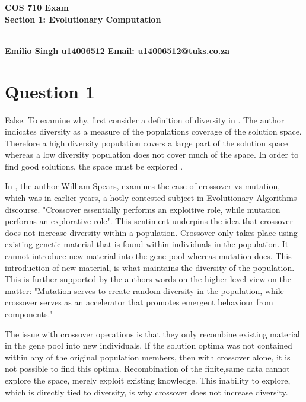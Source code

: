 \documentclass[12pt]{article}
\begin{document}
\begin{large}
\begin{flushleft}
\begin{huge}
\textbf{COS 710 Exam}
\\
\textbf{Section 1: Evolutionary Computation}
\end{huge}
\\
\textbf{Emilio Singh u14006512}
\textbf{Email: u14006512@tuks.co.za}
\end{flushleft}
\end{large}

\section{Question 1}
False. To examine why, first consider a definition of diversity in \cite{Gupta_anoverview}. The author indicates diversity as a measure of the populations coverage of the solution space. Therefore a high diversity population covers a large part of the solution space whereas a low diversity population does not cover much of the space. In order to find good solutions, the space must be explored \cite{Gupta_anoverview}. 

In \cite{spears_1993}, the author William Spears, examines the case of crossover vs mutation, which was in earlier years, a hotly contested subject in Evolutionary Algorithms discourse. "Crossover essentially performs an exploitive role, while mutation performs an explorative role". This sentiment underpins the idea that crossover does not increase diversity within a population. Crossover only takes place using existing genetic material that is found within individuals in the population. It cannot introduce new material into the gene-pool whereas mutation does. This introduction of new material, is what maintains the diversity of the population. This is further supported by the authors words on the higher level view on the matter: "Mutation serves to create random diversity in the population, while crossover serves as an accelerator that promotes emergent behaviour from components."

The issue with crossover operations is that they only recombine existing material in the gene pool into new individuals. If the solution optima was not contained within any of the original population members, then with crossover alone, it is not possible to find this optima. Recombination of the finite,same data cannot explore the space, merely exploit existing knowledge. This inability to explore, which is directly tied to diversity, is why crossover does not increase diversity.
\end{document}
